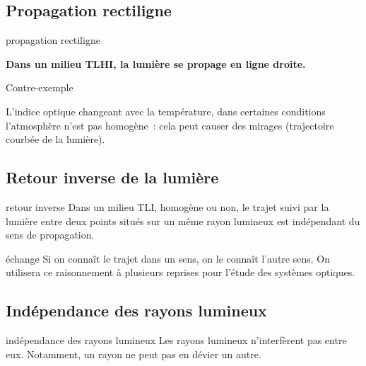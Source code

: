 \documentclass[../main/main.tex]{subfiles}
\begin{document}
\subsection{Propagation rectiligne}

\begin{tcbraster}[raster columns=2, raster equal height=rows]
    \begin{prop}[label=prop:prop_rect, valign=center]{propagation rectiligne}

        \bfseries Dans un milieu TLHI, la lumière se propage en ligne droite.

    \end{prop}
    \begin{NCcexe}[]{Contre-exemple}

        L'indice optique changeant avec la température, dans certaines
        conditions l'atmosphère n'est pas homogène~: cela peut causer des
        mirages (trajectoire courbée de la lumière).

    \end{NCcexe}
\end{tcbraster}

\subsection{Retour inverse de la lumière}

\begin{tcbraster}[raster columns=2, raster equal height=rows]
    \begin{prop}[label=prop:ret_inv]{retour inverse}
        Dans un milieu TLI, homogène ou non, le trajet suivi par la lumière
        entre deux points situés sur un même rayon lumineux est indépendant du
        sens de propagation.
    \end{prop}
    \begin{impl}[label=impl:ret_inv]{échange}
        Si on connaît le trajet dans un sens, on le connaît l'autre sens. On
        utilisera ce raisonnement à plusieurs reprises pour l'étude des systèmes
        optiques.
    \end{impl}
\end{tcbraster}

\subsection{Indépendance des rayons lumineux}

\begin{prop}[label=prop:ind_lum]{indépendance des rayons lumineux}
    Les rayons lumineux n'interfèrent pas entre eux. Notamment, un rayon ne peut
    pas en dévier un autre.
\end{prop}
\end{document}
